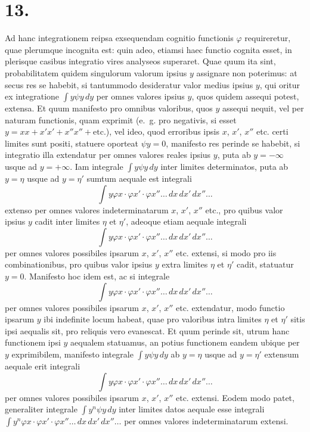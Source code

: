 \documentclass[12pt,a4paper]{book}
\begin{document}
\section*{13.}
\label{sec:art13}

Ad hanc integrationem reipsa exsequendam cognitio functionis $\varphi$ requireretur, quae plerumque incognita est: quin adeo, etiamsi haec functio cognita esset, in plerisque casibus integratio vires analyseos superaret. Quae quum ita sint, probabilitatem quidem singulorum valorum ipsius $y$ assignare non poterimus: at secus res se habebit, si tantummodo desideratur valor medius ipsius $y$, qui oritur ex integratione $\int y\psi y\,dy$ per omnes valores ipsius $y$, quos quidem assequi potest, extensa. Et quum manifesto pro omnibus valoribus, quos $y$ assequi nequit, vel per naturam functionis, quam exprimit (e.~g. pro negativis, si esset $y=xx+x'x'+x''x''+\text{etc.}$), vel ideo, quod erroribus ipsis $x$, $x'$, $x''$ etc. certi limites sunt positi, statuere oporteat $\psi y=0$, manifesto res perinde se habebit, si integratio illa extendatur per omnes valores reales ipsius $y$, puta ab $y=-\infty$ usque ad $y=+\infty$. Iam integrale $\int y\psi y\,dy$ inter limites determinatos, puta ab $y=\eta$ usque ad $y=\eta'$ sumtum aequale est integrali
%
\begin{equation*}
\int y\varphi x\cdot\varphi x'\cdot\varphi x''\ldots\,dx\,dx'\,dx''\ldots
\end{equation*}
extenso per omnes valores indeterminatarum $x$, $x'$, $x''$ etc., pro quibus valor ipsius $y$ cadit inter limites $\eta$ et $\eta'$, adeoque etiam aequale integrali
%
\begin{equation*}
\int y\varphi x\cdot\varphi x'\cdot\varphi x''\ldots\,dx\,dx'\,dx''\ldots
\end{equation*}
per omnes valores possibiles ipsarum $x$, $x'$, $x''$ etc. extensi, si modo pro iis combinationibus, pro quibus valor ipsius $y$ extra limites $\eta$ et $\eta'$ cadit, statuatur $y=0$. Manifesto hoc idem est, ac si integrale
%
\begin{equation*}
\int y\varphi x\cdot\varphi x'\cdot\varphi x''\ldots\,dx\,dx'\,dx''\ldots
\end{equation*}
per omnes valores possibiles ipsarum $x$, $x'$, $x''$ etc. extendatur, modo functio ipsarum $y$ ibi indefinite locum habeat, quae pro valoribus intra limites $\eta$ et $\eta'$ sitis ipsi aequalis sit, pro reliquis vero evanescat. Et quum perinde sit, utrum hanc functionem ipsi $y$ aequalem statuamus, an potius functionem eandem ubique per $y$ exprimibilem, manifesto integrale $\int y\psi y\,dy$ ab $y=\eta$ usque ad $y=\eta'$ extensum aequale erit integrali
%
\begin{equation*}
\int y\varphi x\cdot\varphi x'\cdot\varphi x''\ldots\,dx\,dx'\,dx''\ldots
\end{equation*}
per omnes valores possibiles ipsarum $x$, $x'$, $x''$ etc. extensi. Eodem modo patet, generaliter integrale $\int y^n\psi y\,dy$ inter limites datos aequale esse integrali $\int y^n\varphi x\cdot\varphi x'\cdot\varphi x''\ldots\,dx\,dx'\,dx''\ldots$ per omnes valores indeterminatarum extensi.
\end{document}
